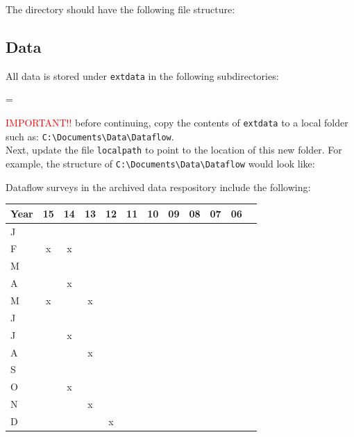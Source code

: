 \documentclass[12pt]{article}
\newenvironment{warning}
{\par\begin{mdframed}[linewidth=2pt,linecolor=red]
\begin{list}{}{\leftmargin=1cm
  \labelwidth=\leftmargin}\item[\Large\ding{43}]}
{\end{list}\end{mdframed}\par}
\begin{document}
The directory should have the following file structure:

\newpage
\subsection{Data}

All data is stored under \texttt{extdata} in the following subdirectories:\\

\vspace{15pt}
\begin{warning}
\textcolor{red}{IMPORTANT!!} before continuing, copy the contents of \texttt{extdata} to a local folder such as: \verb|C:\Documents\Data\Dataflow|.\\ Next, update the file \texttt{localpath} to point to the location of this new folder.
For example, the structure of \verb|C:\Documents\Data\Dataflow| would look like:


\end{warning}

Dataflow surveys in the archived data respository include the following:

\begin{center}
\begin{tabular}{l*{10} {c} r}
\hline
Year & 15 & 14 & 13 & 12 & 11 & 10 & 09 & 08 & 07 & 06\\ \hline
J &  &  &  &  &  &  &  &  &  & \\
F & x & x &  &  &  &  &  &  &  & \\
M &  &  &  &  &  &  &  &  &  & \\
A &  & x &  &  &  &  &  &  &  & \\
M & x &  & x &  &  &  &  &  &  & \\
J &  &  &  &  &  &  &  &  &  & \\
J &  & x &  &  &  &  &  &  &  & \\
A &  &  & x &  &  &  &  &  &  & \\
S &  &  &  &  &  &  &  &  &  & \\
O &  & x &  &  &  &  &  &  &  & \\
N &  &  & x &  &  &  &  &  &  & \\
D &  &  &  & x &  &  &  &  &  & \\
\hline
\end{tabular}
\end{center}
\end{document}

